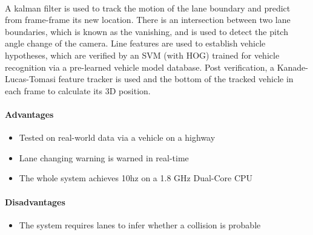 \documentclass[a4paper]{report}
\begin{document}
\paragraph{}A kalman filter is used to track the motion of the lane boundary and predict from frame-frame its new location. There is an intersection between two lane boundaries, which is known as the vanishing, and is used to detect the pitch angle change of the camera. Line features are used to establish vehicle hypotheses, which are verified by an SVM (with HOG) trained for vehicle recognition via a pre-learned vehicle model database. Post verification, a Kanade-Lucas-Tomasi feature tracker is used and the bottom of the tracked vehicle in each frame to calculate its 3D position.
\paragraph{Advantages}
\begin{itemize}
\item Tested on real-world data via a vehicle on a highway
\item Lane changing warning is warned in real-time
\item The whole system achieves 10hz on a 1.8 GHz Dual-Core CPU
\end{itemize}

\paragraph{Disadvantages}
\begin{itemize}
\item The system requires lanes to infer whether a collision is probable	 	
\end{itemize}
\end{document}
